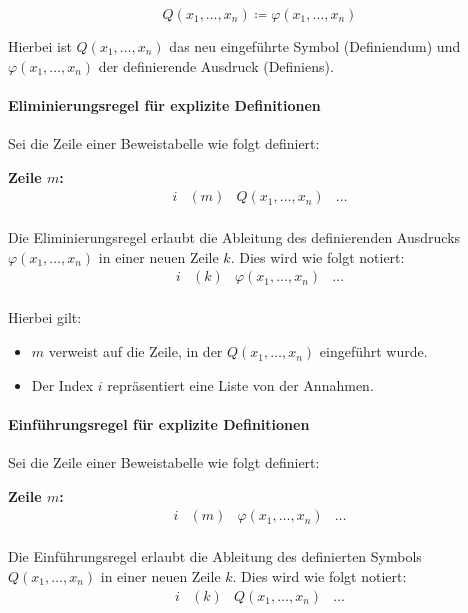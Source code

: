 \documentclass[main.tex]{subfiles}
\begin{document}
\begin{definition}[\(Q\) (explizit)]
\[
Q(x_1,\dots,x_n) \coloneqq \varphi(x_1,\dots,x_n)
\]    
\end{definition}

Hierbei ist \(Q(x_1,\dots,x_n)\) das neu eingeführte Symbol (Definiendum) und \(\varphi(x_1,\dots,x_n)\) der definierende Ausdruck (Definiens).

\paragraph{Eliminierungsregel für explizite Definitionen}
Sei die Zeile einer Beweistabelle wie folgt definiert:

\textbf{Zeile \(m\):}
\[
\begin{array}{llll}
   i & (m) & Q(x_1,\dots,x_n) & \dots \\
\end{array}
\]

Die Eliminierungsregel erlaubt die Ableitung des definierenden Ausdrucks \(\varphi(x_1,\dots,x_n)\) in einer neuen Zeile \(k\). Dies wird wie folgt notiert:
\[
\begin{array}{llll}
   i& (k) & \varphi(x_1,\dots,x_n) & ... \\
\end{array}
\]

Hierbei gilt:
\begin{itemize}
    \item \(m\) verweist auf die Zeile, in der \(Q(x_1,\dots,x_n)\) eingeführt wurde.
    \item Der Index \(i\) repräsentiert eine Liste von der Annahmen.
\end{itemize}

\paragraph{Einführungsregel für explizite Definitionen}
Sei die Zeile einer Beweistabelle wie folgt definiert:

\textbf{Zeile \(m\):}
\[
\begin{array}{llll}
   i& (m) & \varphi(x_1,\dots,x_n) & \dots \\
\end{array}
\]

Die Einführungsregel erlaubt die Ableitung des definierten Symbols \(Q(x_1,\dots,x_n)\) in einer neuen Zeile \(k\). Dies wird wie folgt notiert:
\[
\begin{array}{llll}
   i& (k) & Q(x_1,\dots,x_n) & ... \\
\end{array}
\]
\end{document}
